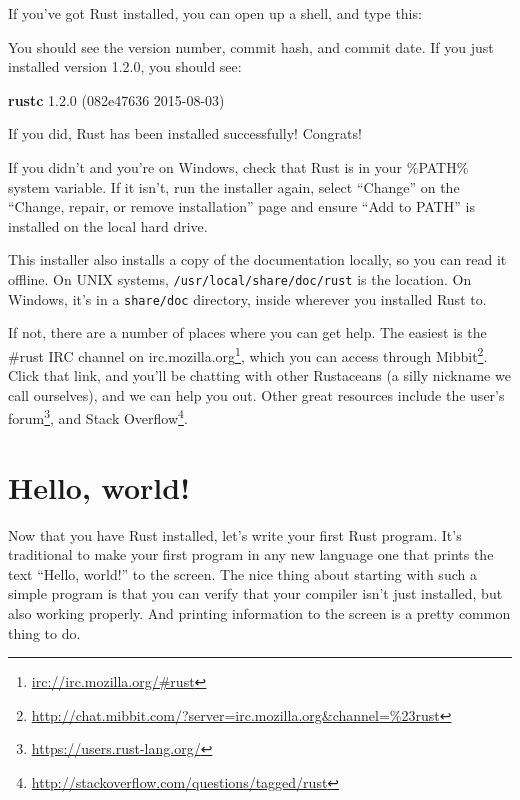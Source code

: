 \documentclass[a4paper,]{book}
\newenvironment{Shaded}{\begin{snugshade}}{\end{snugshade}}
\newcommand{\KeywordTok}[1]{\textcolor[rgb]{0.13,0.29,0.53}{\textbf{{#1}}}}
\newcommand{\NormalTok}[1]{{#1}}
\renewcommand{\href}[2]{#2\footnote{\url{#1}}}
\begin{document}
If you've got Rust installed, you can open up a shell, and type this:

\begin{Shaded}
\end{Shaded}

You should see the version number, commit hash, and commit date. If you
just installed version 1.2.0, you should see:

\begin{Shaded}
\begin{Highlighting}[]
\KeywordTok{rustc} \NormalTok{1.2.0 (082e47636 2015-08-03)}
\end{Highlighting}
\end{Shaded}

If you did, Rust has been installed successfully! Congrats!

If you didn't and you're on Windows, check that Rust is in your \%PATH\%
system variable. If it isn't, run the installer again, select ``Change''
on the ``Change, repair, or remove installation'' page and ensure ``Add
to PATH'' is installed on the local hard drive.

This installer also installs a copy of the documentation locally, so you
can read it offline. On UNIX systems, \texttt{/usr/local/share/doc/rust}
is the location. On Windows, it's in a \texttt{share/doc} directory,
inside wherever you installed Rust to.

If not, there are a number of places where you can get help. The easiest
is \href{irc://irc.mozilla.org/\#rust}{the \#rust IRC channel on
irc.mozilla.org}, which you can access through
\href{http://chat.mibbit.com/?server=irc.mozilla.org\&channel=\%23rust}{Mibbit}.
Click that link, and you'll be chatting with other Rustaceans (a silly
nickname we call ourselves), and we can help you out. Other great
resources include \href{https://users.rust-lang.org/}{the user's forum},
and \href{http://stackoverflow.com/questions/tagged/rust}{Stack
Overflow}.

\section{Hello, world!}\label{sec--hello-world}

Now that you have Rust installed, let's write your first Rust program.
It's traditional to make your first program in any new language one that
prints the text ``Hello, world!'' to the screen. The nice thing about
starting with such a simple program is that you can verify that your
compiler isn't just installed, but also working properly. And printing
information to the screen is a pretty common thing to do.
\end{document}
